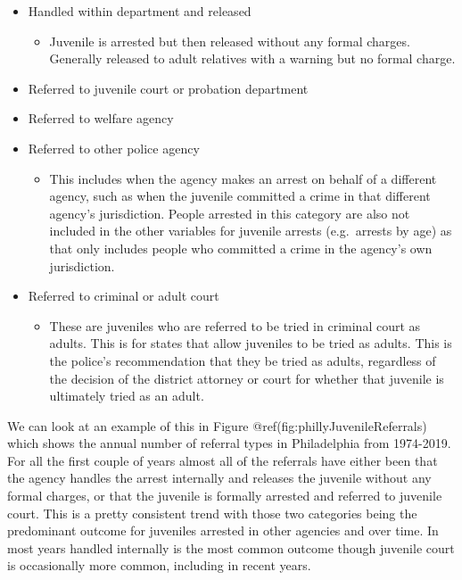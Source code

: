 \documentclass[
  12pt,
  openany]{book}
\providecommand{\tightlist}{%
  \setlength{\itemsep}{0pt}\setlength{\parskip}{0pt}}
\begin{document}
\begin{itemize}
\tightlist
\item
  Handled within department and released

  \begin{itemize}
  \tightlist
  \item
    Juvenile is arrested but then released without any formal charges. Generally released to adult relatives with a warning but no formal charge.
  \end{itemize}
\item
  Referred to juvenile court or probation department
\item
  Referred to welfare agency
\item
  Referred to other police agency

  \begin{itemize}
  \tightlist
  \item
    This includes when the agency makes an arrest on behalf of a different agency, such as when the juvenile committed a crime in that different agency's jurisdiction. People arrested in this category are also not included in the other variables for juvenile arrests (e.g.~arrests by age) as that only includes people who committed a crime in the agency's own jurisdiction.
  \end{itemize}
\item
  Referred to criminal or adult court

  \begin{itemize}
  \tightlist
  \item
    These are juveniles who are referred to be tried in criminal court as adults. This is for states that allow juveniles to be tried as adults. This is the police's recommendation that they be tried as adults, regardless of the decision of the district attorney or court for whether that juvenile is ultimately tried as an adult.
  \end{itemize}
\end{itemize}

We can look at an example of this in Figure @ref(fig:phillyJuvenileReferrals) which shows the annual number of referral types in Philadelphia from 1974-2019. For all the first couple of years almost all of the referrals have either been that the agency handles the arrest internally and releases the juvenile without any formal charges, or that the juvenile is formally arrested and referred to juvenile court. This is a pretty consistent trend with those two categories being the predominant outcome for juveniles arrested in other agencies and over time. In most years handled internally is the most common outcome though juvenile court is occasionally more common, including in recent years.
\end{document}
